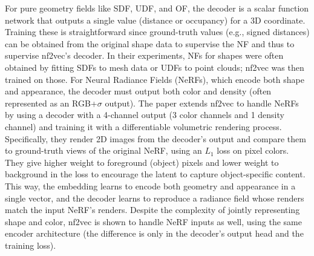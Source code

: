 \documentclass[11pt]{article}
\begin{document}
For pure geometry fields like SDF, UDF, and OF, the decoder is a scalar function network that outputs a single value (distance or occupancy) for a 3D coordinate. Training these is straightforward since ground-truth values (e.g., signed distances) can be obtained from the original shape data to supervise the NF and thus to supervise nf2vec’s decoder. In their experiments, NFs for shapes were often obtained by fitting SDFs to mesh data or UDFs to point clouds; nf2vec was then trained on those.
For Neural Radiance Fields (NeRFs), which encode both shape and appearance, the decoder must output both color and density (often represented as an RGB+$\sigma$ output). The paper extends nf2vec to handle NeRFs by using a decoder with a 4-channel output (3 color channels and 1 density channel) and training it with a differentiable volumetric rendering process. Specifically, they render 2D images from the decoder’s output and compare them to ground-truth views of the original NeRF, using an $L_1$ loss on pixel colors. They give higher weight to foreground (object) pixels and lower weight to background in the loss to encourage the latent to capture object-specific content. This way, the embedding learns to encode both geometry and appearance in a single vector, and the decoder learns to reproduce a radiance field whose renders match the input NeRF’s renders. Despite the complexity of jointly representing shape and color, nf2vec is shown to handle NeRF inputs as well, using the same encoder architecture (the difference is only in the decoder’s output head and the training loss).
\end{document}
